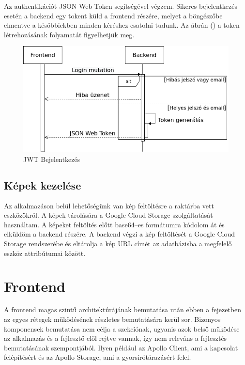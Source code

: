 Az authentikációt JSON Web Token segítségével végzem. 
Sikeres bejelentkezés esetén a backend egy tokent küld a frontend részére, melyet a böngészőbe elmentve a későbbiekben minden kéréshez csatolni tudunk. Az ábrán () a token létrehozásának folyamatát figyelhetjük meg.

\begin{figure}[!ht]
  \centering
  \includegraphics[width=150mm, keepaspectratio]{figures/login.png}
  \caption{JWT Bejelentkezés}
  \label{fig:JWT}
\end{figure}

\subsection{Képek kezelése}
Az alkalmazáson belül lehetőségünk van kép feltöltésre a raktárba vett eszközökről.
A képek tárolására a Google Cloud Storage szolgáltatását használtam. 
A képeket feltöltés előtt base64–es formátumra kódolom át és elküldöm a backend részére.
A backend végzi a kép feltöltését a Google Cloud Storage rendszerébe és eltárolja a kép URL címét az adatbázisba a megfelelő eszköz attribútumai között.

\section{Frontend}
A frontend magas szintű architektúrájának bemutatása után ebben a fejezetben az egyes rétegek működésének részletes bemutatására kerül sor. Bizonyos komponensek bemutatása nem célja a szekciónak, ugyanis azok belső működése az alkalmazás és a fejlesztő elől rejtve vannak, így nem releváns a fejlesztés bemutatásának szempontjából. Ilyen például az Apollo Client, ami a kapcsolat felépítésért és az Apollo Storage, ami a gyorsírótárazásért felel.

